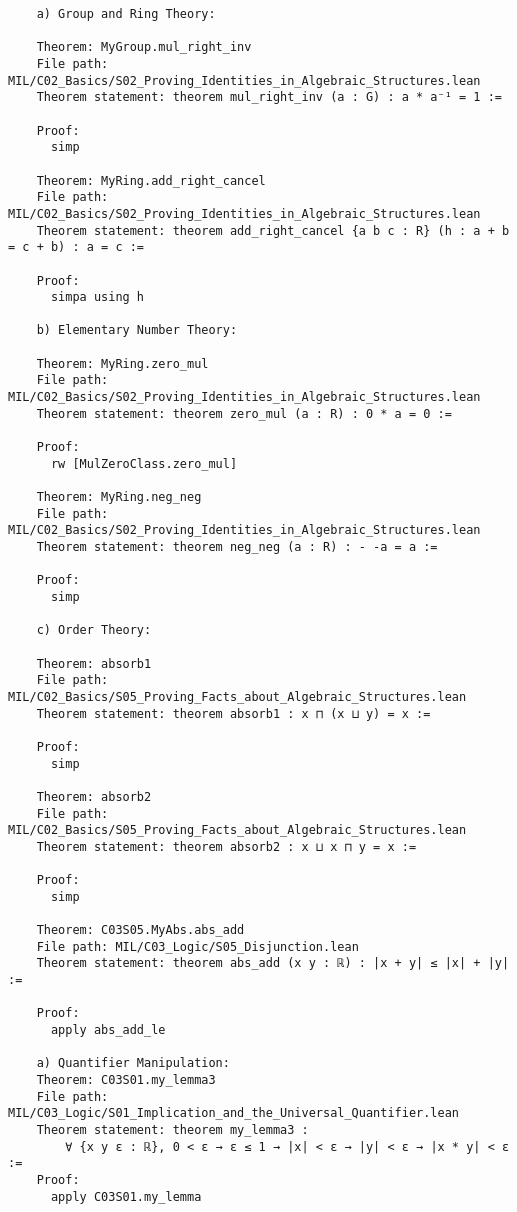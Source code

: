 \documentclass{article} %
\begin{document}
\begin{verbatim}
    a) Group and Ring Theory:

    Theorem: MyGroup.mul_right_inv
    File path: MIL/C02_Basics/S02_Proving_Identities_in_Algebraic_Structures.lean
    Theorem statement: theorem mul_right_inv (a : G) : a * a⁻¹ = 1 :=
    
    Proof:
      simp
    
    Theorem: MyRing.add_right_cancel
    File path: MIL/C02_Basics/S02_Proving_Identities_in_Algebraic_Structures.lean
    Theorem statement: theorem add_right_cancel {a b c : R} (h : a + b = c + b) : a = c :=
    
    Proof:
      simpa using h

    b) Elementary Number Theory:

    Theorem: MyRing.zero_mul
    File path: MIL/C02_Basics/S02_Proving_Identities_in_Algebraic_Structures.lean
    Theorem statement: theorem zero_mul (a : R) : 0 * a = 0 :=
    
    Proof:
      rw [MulZeroClass.zero_mul]
    
    Theorem: MyRing.neg_neg
    File path: MIL/C02_Basics/S02_Proving_Identities_in_Algebraic_Structures.lean
    Theorem statement: theorem neg_neg (a : R) : - -a = a :=
    
    Proof:
      simp

    c) Order Theory:

    Theorem: absorb1
    File path: MIL/C02_Basics/S05_Proving_Facts_about_Algebraic_Structures.lean
    Theorem statement: theorem absorb1 : x ⊓ (x ⊔ y) = x :=
    
    Proof:
      simp
    
    Theorem: absorb2
    File path: MIL/C02_Basics/S05_Proving_Facts_about_Algebraic_Structures.lean
    Theorem statement: theorem absorb2 : x ⊔ x ⊓ y = x :=
    
    Proof:
      simp

    Theorem: C03S05.MyAbs.abs_add
    File path: MIL/C03_Logic/S05_Disjunction.lean
    Theorem statement: theorem abs_add (x y : ℝ) : |x + y| ≤ |x| + |y| :=
    
    Proof:
      apply abs_add_le

    a) Quantifier Manipulation:
    Theorem: C03S01.my_lemma3
    File path: MIL/C03_Logic/S01_Implication_and_the_Universal_Quantifier.lean
    Theorem statement: theorem my_lemma3 :
        ∀ {x y ε : ℝ}, 0 < ε → ε ≤ 1 → |x| < ε → |y| < ε → |x * y| < ε :=
    Proof:
      apply C03S01.my_lemma
    

\end{verbatim}
\end{document}
